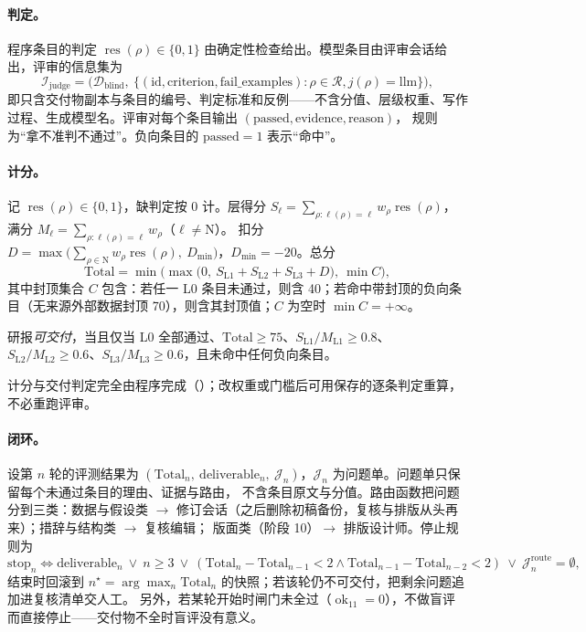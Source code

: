 \paragraph{判定。}
程序条目的判定 $\operatorname{res}(\rho)\in\{0,1\}$ 由确定性检查给出。模型条目由评审会话给出，评审的信息集为
\begin{equation}
\mathcal{I}_{\text{judge}} = \big(\mathcal{D}_{\text{blind}},\ \{(\text{id},\text{criterion},\text{fail\_examples}) : \rho\in\mathcal{R}, j(\rho)=\text{llm}\}\big),
\label{eq:prob-judgeinfo}
\end{equation}
即只含交付物副本与条目的编号、判定标准和反例——不含分值、层级权重、写作过程、生成模型名。评审对每个条目输出 $(\text{passed},\text{evidence},\text{reason})$，
规则为“拿不准判不通过”。负向条目的 $\text{passed}=1$ 表示“命中”。

\paragraph{计分。}
记 $\operatorname{res}(\rho)\in\{0,1\}$，缺判定按 0 计。层得分 $S_\ell=\sum_{\rho:\ell(\rho)=\ell} w_\rho\operatorname{res}(\rho)$，满分 $M_\ell=\sum_{\rho:\ell(\rho)=\ell}w_\rho$（$\ell\neq\text{N}$）。
扣分 $D=\max\big(\sum_{\rho\in\text{N}}w_\rho\operatorname{res}(\rho),\ D_{\min}\big)$，$D_{\min}=-20$。总分
\begin{equation}
\text{Total}=\min\Big(\max\big(0,\ S_{\text{L1}}+S_{\text{L2}}+S_{\text{L3}}+D\big),\ \min C\Big),
\label{eq:prob-score}
\end{equation}
其中封顶集合 $C$ 包含：若任一 L0 条目未通过，则含 40；若命中带封顶的负向条目（无来源外部数据封顶 70），则含其封顶值；$C$ 为空时 $\min C=+\infty$。

\begin{definition}[交付标准]
\label{def:prob-deliver}
研报\emph{可交付}，当且仅当 L0 全部通过、$\text{Total}\ge 75$、$S_{\text{L1}}/M_{\text{L1}}\ge0.8$、$S_{\text{L2}}/M_{\text{L2}}\ge0.6$、$S_{\text{L3}}/M_{\text{L3}}\ge0.6$，且未命中任何负向条目。
\end{definition}

计分与交付判定完全由程序完成（）；改权重或门槛后可用保存的逐条判定重算，不必重跑评审。

\paragraph{闭环。}
设第 $n$ 轮的评测结果为 $(\text{Total}_n,\ \text{deliverable}_n,\ \mathcal{J}_n)$，$\mathcal{J}_n$ 为问题单。问题单只保留每个未通过条目的理由、证据与路由，
不含条目原文与分值。路由函数把问题分到三类：数据与假设类 $\to$ 修订会话（之后删除初稿备份，复核与排版从头再来）；措辞与结构类 $\to$ 复核编辑；
版面类（阶段 10）$\to$ 排版设计师。停止规则为
\[
\text{stop}_n \iff \text{deliverable}_n \ \vee\ n\ge 3 \ \vee\ (\text{Total}_n-\text{Total}_{n-1}<2 \wedge \text{Total}_{n-1}-\text{Total}_{n-2}<2)\ \vee\ \mathcal{J}_n^{\text{route}}=\emptyset,
\]
结束时回滚到 $n^\star=\arg\max_n\text{Total}_n$ 的快照；若该轮仍不可交付，把剩余问题追加进复核清单交人工。
另外，若某轮开始时闸门未全过（$\operatorname{ok}_{11}=0$），不做盲评而直接停止——交付物不全时盲评没有意义。

